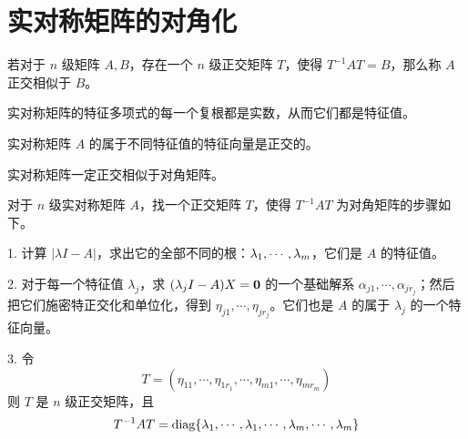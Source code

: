\section{实对称矩阵的对角化}

若对于 $n$ 级矩阵 $A,B$，存在一个 $n$ 级正交矩阵 $T$，使得 $T^{-1}AT=B$，那么称 $A$ 正交相似于 $B$。

\begin{theorem}
	实对称矩阵的特征多项式的每一个复根都是实数，从而它们都是特征值。
\end{theorem}

\begin{theorem}
	实对称矩阵 $A$ 的属于不同特征值的特征向量是正交的。
\end{theorem}

\begin{theorem}
	实对称矩阵一定正交相似于对角矩阵。
\end{theorem}

对于 $n$ 级实对称矩阵 $A$，找一个正交矩阵 $T$，使得 $T^{-1}AT$ 为对角矩阵的步骤如下。

1. 计算 $|\lambda I- A|$，求出它的全部不同的根：$\lambda_1,\cdots,\lambda_m$，它们是 $A$ 的特征值。

2. 对于每一个特征值 $\lambda_j$，求 $(\lambda_jI-A)X = \boldsymbol{0}$ 的一个基础解系 $\alpha_{j1},\cdots,\alpha_{jr_j}$；然后把它们施密特正交化和单位化，得到 $\eta_{j1},\cdots,\eta_{jr_j}$。它们也是 $A$ 的属于 $\lambda_j$ 的一个特征向量。

3. 令
\[T=(\eta_{11},\cdots,\eta_{1r_1},\cdots,\eta_{m1},\cdots,\eta_{mr_m})\]
则 $T$ 是 $n$ 级正交矩阵，且
\[T^{-1}AT = \operatorname{diag}\{\lambda_{1},\cdots,\lambda_{1},\cdots,\lambda_{m},\cdots,\lambda_{m}\}\]
